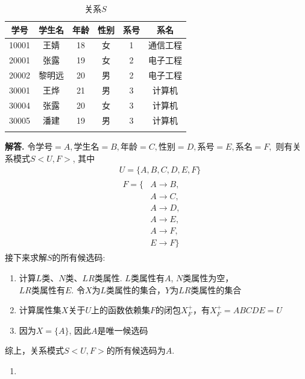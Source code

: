 \documentclass[12pt, a4paper, oneside]{ctexart}
\newenvironment{solution}{\par\noindent\textbf{解答. }}{\par}
\begin{document}
\begin{longtable}{|c|c|c|c|c|c|}
    \hline
    \bf 学号 & \bf 学生名 & \bf 年龄 & \bf 性别 & \bf 系号 & \bf 系名 \\
    \hline
    10001 & 王婧 & 18 & 女 & 1 & 通信工程 \\
    20001 & 张露 & 19 & 女 & 2 & 电子工程 \\
    20002 & 黎明远 & 20 & 男 & 2 & 电子工程 \\
    30001 & 王烨 & 21 & 男 & 3 & 计算机 \\
    30004 & 张露 & 20 & 女 & 3 & 计算机 \\
    30005 & 潘建 & 19 & 男 & 3 & 计算机 \\
    \hline
    \caption{关系$S$}
    \label{S}
\end{longtable}

\begin{solution}
    令$\text{学号} = A, \text{学生名} = B, \text{年龄} = C, \text{性别} = D, \text{系号} = E, \text{系名} = F,$
    则有关系模式$S<U,F>$, 其中
    $$
        \begin{aligned}
            & U = \{A, B, C, D, E, F\} \\
            & \begin{aligned}
                F = \{ &A\rightarrow B, \\
                & A\rightarrow C, \\
                & A\rightarrow D, \\
                & A\rightarrow E, \\
                & A\rightarrow F, \\
                & E\rightarrow F\}
              \end{aligned}
        \end{aligned}
    $$
    接下来求解$S$的所有候选码:
    \begin{enumerate}[$1^\circ$]
        \item 计算$L$类、$N$类、$LR$类属性. $L$类属性有$A$, $N$类属性为空，\\
        $LR$类属性有$E$. 令$X$为$L$类属性的集合，$Y$为$LR$类属性的集合
        \item 计算属性集$X$关于$U$上的函数依赖集$F$的闭包$X_F^+$，有$X_F^+ = ABCDE = U$
        \item 因为$X = \{ A \}$, 因此$A$是唯一候选码
    \end{enumerate}
    综上，关系模式$S<U, F>$的所有候选码为$A$.
    \begin{enumerate}[(1)]
        \item 

\end{enumerate}
\end{solution}
\end{document}

